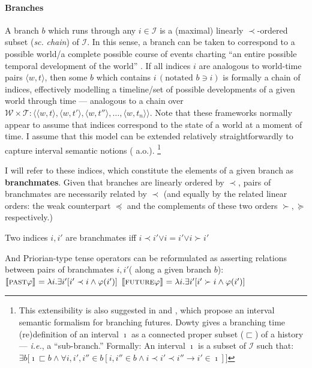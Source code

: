 \documentclass[12pt,dvipsnames]{report}
\providecommand{\denote}[2][]{\ensuremath{\llbracket{#2}\rrbracket^{#1}}}
\begin{document}
\paragraph{Branches} A branch $b $ which runs through any $ i\in\mathcal I $ is a (maximal) linearly $ \prec $-ordered subset (\textit{sc.} \textit{chain}) of $ \mathcal I $. In this sense, a branch can be taken to correspond to a possible world/a complete possible course of events charting ``an entire possible temporal development of the world'' \citep[148]{Rumberg2019}. If all indices $ i$ are analogous to world-time pairs $\langle w,t\rangle $, then some $ b$ which contains $ i\, (\text{notated }b\ni i)$ is formally a chain of indices, effectively modelling a timeline/set of possible developments of a given world through time --- analogous to a chain over $ \mathcal{W\times T}:\big\langle\langle w,t\rangle,\langle w,t'\rangle,\langle w,t''\rangle,\hdots,\langle w,t_n\rangle\big\rangle$. Note that these frameworks normally appear to assume that indices correspond to the state of a world at a moment of time. I assume that this model can be extended relatively straightforwardly to capture interval semantic notions (\citealp[\textit{e.g.},][]{Landman1991,Dowty1982,Bennett} a.o.). \footnote{This extensibility is also suggested in \citealp{Dowty1977} and \citealt{Tedeschi1981}, which propose an interval semantic formalism for branching futures. Dowty gives a branching time (re)definition of an interval $ \boldsymbol\imath $ as a connected proper subset ($ \sqsubset $) of a history \citeyearpar[64]{Dowty1977} --- \textit{i.e.}, a ``sub-branch.'' Formally:
\exdisplay An interval $ \boldsymbol\imath $ is a subset of $ \mathcal I $ such that: $\exists b\big[\boldsymbol\imath\sqsubset b\wedge\forall i,i',i''\in b[i,i''\in b\wedge i\prec i'\prec i''\to i'\in\boldsymbol\imath]\big] $

\xe}

I will refer to these indices, which constitute the elements of a given branch as \textbf{branchmates}. Given that branches are linearly ordered by $ \prec $, pairs of branchmates are necessarily related by $ \prec $ (and equally by the related linear orders: the weak counterpart $\boldsymbol\preccurlyeq$ and the complements of these two orders $\succ,\succcurlyeq $ respectively.)


\pex Two indices $ i,i' $ are branchmates iff $ i\prec i'\boldsymbol\vee i=i'\boldsymbol\vee i\succ i' $

\xe
And Priorian-type tense operators can be reformulated as asserting relations between pairs of branchmates $ i,i' $( along a given branch $ b $):
\pex
\a$\denote{\textsc{past} \varphi }=\lambda i.\exists i'[i'\prec i\wedge\varphi (i')]$
\a$\denote{\textsc{future} \varphi }=\lambda i.\exists i'[i'\succ i\wedge\varphi (i')]$
\end{document}
